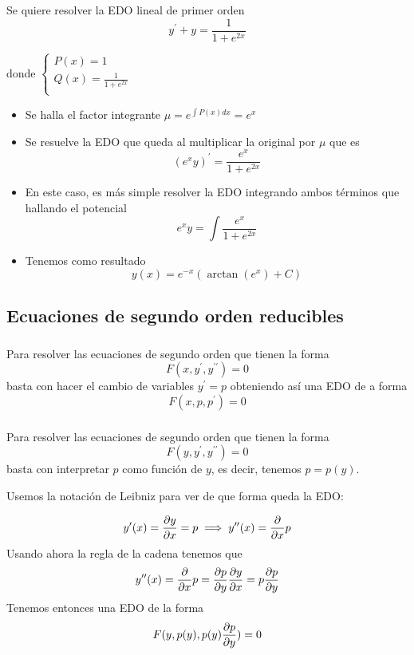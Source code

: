 \begin{example}
Se quiere resolver la EDO lineal de primer orden
$$y^\prime + y = \frac{1}{1+e^{2x}}$$

donde
$
  \left\lbrace
  \begin{array}{l}
     P(x) = 1 \\
     Q(x) = \frac{1}{1+e^{2x}} \\
  \end{array}
  \right.
$

\begin{itemize}
\item Se halla el factor integrante $\mu = e^{\int P(x)dx} = e^x$
\item Se resuelve la EDO que queda al multiplicar la original por $\mu$ que es
$$(e^xy)^\prime = \frac{e^x}{1+e^{2x}}$$
\item En este caso, es más simple resolver la EDO integrando ambos términos que hallando el potencial
$$e^xy=\int \frac{e^x}{1+e^{2x}}$$
\item Tenemos como resultado
$$y(x) = e^{-x}(\arctan (e^x) + C)$$
\end{itemize}
\end{example}

\subsection{Ecuaciones de segundo orden reducibles}
\subsubsection{}
Para resolver las ecuaciones de segundo orden que tienen la forma $$F(x, y^\prime, y^{\prime\prime}) = 0$$ basta con hacer el cambio de variables $y^\prime = p$ obteniendo así una EDO de a forma $$F(x, p, p^\prime) = 0$$

\subsubsection{}
Para resolver las ecuaciones de segundo orden que tienen la forma $$F(y,y^\prime, y^{\prime\prime}) = 0$$ basta con interpretar $p$ como función de $y$, es decir, tenemos $p = p(y)$.

Usemos la notación de Leibniz para ver de que forma queda la EDO:

$$y^\prime(x) = \partialder{x}{y} = p \implies y^{\prime\prime}(x) = \derivative{x}p$$
Usando ahora la regla de la cadena tenemos que
$$y^{\prime\prime}(x) = \derivative{x}p = \partialder{y}{p}\partialder{x}{y} = p\partialder{y}{p}$$
Tenemos entonces una EDO de la forma $$F(y, p(y), p(y)\partialder{y}{p}) = 0$$

